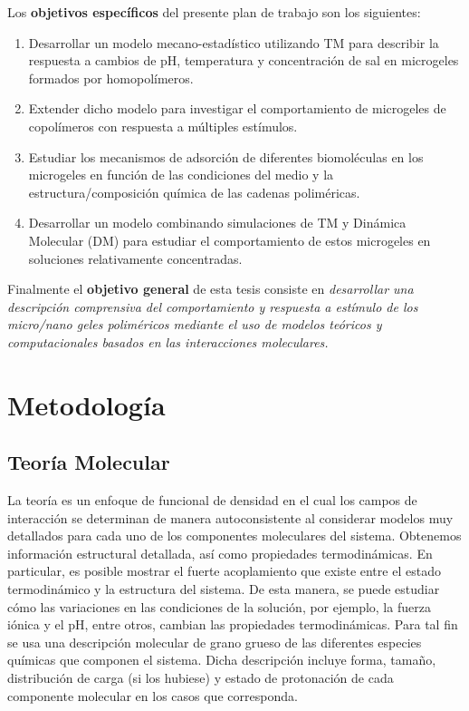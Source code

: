 Los {\bf objetivos específicos} del presente plan de trabajo son los siguientes:
%
\begin{enumerate}
	\item Desarrollar un modelo mecano-estadístico utilizando TM para describir la respuesta a cambios de pH, temperatura y concentración de sal en microgeles formados por homopolímeros.%
	\item Extender dicho modelo para investigar el comportamiento de microgeles de copolímeros con respuesta a múltiples estímulos.%
	\item Estudiar los mecanismos de adsorción de diferentes biomoléculas en los microgeles en función de las condiciones del medio y la estructura/composición química de las cadenas poliméricas.%
	\item Desarrollar un modelo combinando simulaciones de TM y Dinámica Molecular (DM) para estudiar el comportamiento de estos microgeles en soluciones relativamente concentradas.%
\end{enumerate}
%

Finalmente el \textbf{objetivo general} de esta tesis consiste en \emph{desarrollar una descripci\'on comprensiva del comportamiento y respuesta a est\'imulo de los micro/nano geles polim\'ericos mediante el uso de modelos te\'oricos y computacionales basados en las interacciones moleculares.}



\section{Metodolog\'ia}

\subsection{Teor\'ia Molecular}

La teor\'ia es un enfoque de funcional de densidad en el cual los campos de interacci\'on se determinan de manera autoconsistente al considerar modelos muy detallados para cada uno de los componentes moleculares del sistema. Obtenemos informaci\'on estructural detallada, as\'i como propiedades termodin\'amicas. En particular, es posible mostrar el fuerte acoplamiento que existe entre el estado termodin\'amico y la estructura del sistema. De esta manera, se puede estudiar c\'omo las variaciones en las condiciones de la soluci\'on, por ejemplo, la fuerza i\'onica y el pH, entre otros, cambian las propiedades termodin\'amicas.
Para tal fin se usa  una descripci\'on molecular de grano grueso de las diferentes especies qu\'imicas que componen el sistema.
Dicha descripci\'on incluye forma, tama\~no, distribuci\'on de carga (si los hubiese) y estado de protonaci\'on de cada componente molecular en los casos que corresponda.

